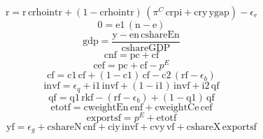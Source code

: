 \begin{dmath}
{{\mathrm{r}}}={{\mathrm{r}}}\, {{\mathrm{crhointr}}}+\left(1-{{\mathrm{crhointr}}}\right)\, \left({{\pi^{C}}}\, {{\mathrm{crpi}}}+{{\mathrm{cry}}}\, {{\mathrm{ygap}}}\right)-{{\epsilon_{r}}}
\end{dmath}
\begin{dmath}
0={{\mathrm{e1}}}\, \left({{\mathrm{n}}}-{{\mathrm{e}}}\right)
\end{dmath}
\begin{dmath}
{{\mathrm{gdp}}}=\frac{{{\mathrm{y}}}-{{\mathrm{en}}}\, {{\mathrm{cshareEn}}}}{{{\mathrm{cshareGDP}}}}
\end{dmath}
\begin{dmath}
{{\mathrm{cnf}}}={{\mathrm{pc}}}+{{\mathrm{cf}}}
\end{dmath}
\begin{dmath}
{{\mathrm{cef}}}={{\mathrm{pc}}}+{{\mathrm{cf}}}-{{p^{E}}}
\end{dmath}
\begin{dmath}
{{\mathrm{cf}}}={{\mathrm{c1}}}\, {{\mathrm{cf}}}+\left(1-{{\mathrm{c1}}}\right)\, {{\mathrm{cf}}}-{{\mathrm{c2}}}\, \left({{\mathrm{rf}}}-{{\epsilon_{b}}}\right)
\end{dmath}
\begin{dmath}
{{\mathrm{invf}}}={{\epsilon_{q}}}+{{\mathrm{i1}}}\, {{\mathrm{invf}}}+\left(1-{{\mathrm{i1}}}\right)\, {{\mathrm{invf}}}+{{\mathrm{i2}}}\, {{\mathrm{qf}}}
\end{dmath}
\begin{dmath}
{{\mathrm{qf}}}={{\mathrm{q1}}}\, {{\mathrm{rkf}}}-\left({{\mathrm{rf}}}-{{\epsilon_{b}}}\right)+\left(1-{{\mathrm{q1}}}\right)\, {{\mathrm{qf}}}
\end{dmath}
\begin{dmath}
{{\mathrm{etotf}}}={{\mathrm{cweightEn}}}\, {{\mathrm{enf}}}+{{\mathrm{cweightCe}}}\, {{\mathrm{cef}}}
\end{dmath}
\begin{dmath}
{{\mathrm{exportsf}}}={{p^{E}}}+{{\mathrm{etotf}}}
\end{dmath}
\begin{dmath}
{{\mathrm{yf}}}={{\epsilon_{g}}}+{{\mathrm{cshareN}}}\, {{\mathrm{cnf}}}+{{\mathrm{ciy}}}\, {{\mathrm{invf}}}+{{\mathrm{cvy}}}\, {{\mathrm{vf}}}+{{\mathrm{cshareX}}}\, {{\mathrm{exportsf}}}
\end{dmath}
